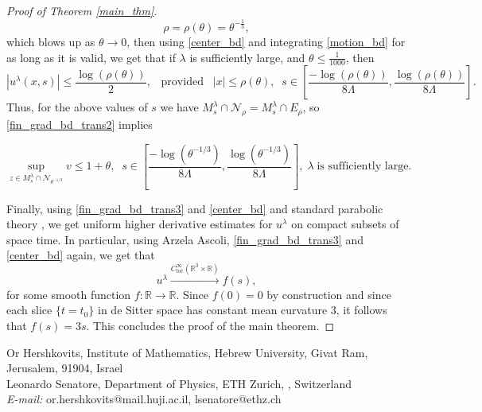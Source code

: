 \documentclass[leqno,11pt]{amsart}
\theoremstyle{definition}
\begin{document}
\begin{proof}[Proof of Theorem \ref{main_thm}]
\begin{equation}
\rho=\rho(\theta)=\theta^{-\frac{1}{3}},
\end{equation}
which blows up as $\theta\rightarrow 0$, then {using  \eqref{center_bd} and integrating  \eqref{motion_bd} for as long as it is valid, } we get that if $\lambda$ is sufficiently large, { and $\theta \leq \frac{1}{1000}$,} then
\begin{equation}
|u^{\lambda}(x,s)|\leq \frac{\log(\rho(\theta))}{2},\;\;\; \textrm{provided}\;\;\; |x|\leq \rho(\theta),\;\;s\in  \left[\frac{-\log(\rho(\theta))}{8\Lambda}, \frac{\log(\rho(\theta))}{8\Lambda} \right].
\end{equation}
Thus, for the above values of $s$ we have $M^{\lambda}_s\cap \mathcal{N}_{\rho}=M^{\lambda}_s \cap E_{\rho}$, so \eqref{fin_grad_bd_trans2} implies

\begin{equation}\label{fin_grad_bd_trans3}
\sup_{z\in M^{\lambda}_s \cap \mathcal{N}_{\theta^{-1/3}}} v \leq 1+\theta,\;\;s\in  \left[\frac{-\log(\theta^{-1/3})}{8\Lambda}, \frac{\log(\theta^{-1/3})}{8\Lambda} \right], \; \lambda\; \textrm{is sufficiently large}.
\end{equation}

\bigskip

Finally, using \eqref{fin_grad_bd_trans3} and \eqref{center_bd} and standard parabolic theory \cite{Lieberman}, we get uniform higher derivative estimates for $u^\lambda$ on compact subsets of space time. In particular, using Arzela Ascoli, \eqref{fin_grad_bd_trans3} and \eqref{center_bd} again, we get that
\begin{equation}
u^{\lambda}\xrightarrow{C^{\infty}_{\mathrm{loc}}(\mathbb{R}^3\times \mathbb{R})} f(s),
\end{equation}
for some smooth function $f:\mathbb{R}\rightarrow \mathbb{R}$. Since $f(0)=0$ by construction and since each slice $\{t=t_0\}$ in de Sitter space has constant mean curvature $3$, it follows that $f(s)=3s$. This concludes the proof of the main theorem. 
\end{proof}







\bigskip





\vspace{10mm}

{\sc Or Hershkovits, Institute of Mathematics, Hebrew University, Givat Ram, Jerusalem, 91904, Israel}\\

{\sc Leonardo Senatore, Department of Physics, ETH Zurich, , Switzerland}\\

\emph{E-mail:}  or.hershkovits@mail.huji.ac.il, lsenatore@ethz.ch
\end{document}
